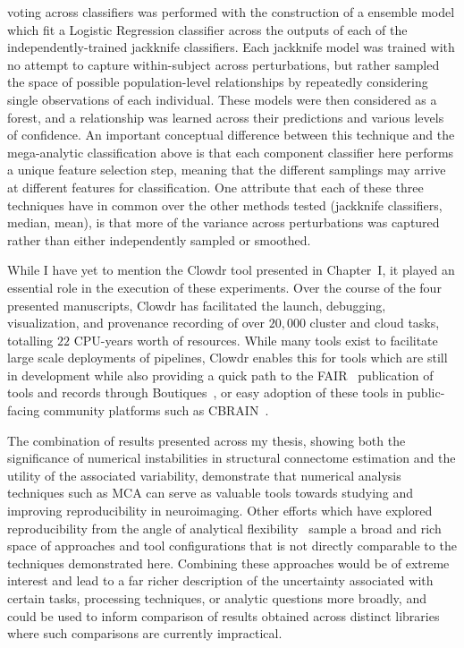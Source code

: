 voting across classifiers was performed with the construction of a ensemble model which fit a Logistic Regression
classifier across the outputs of each of the independently-trained jackknife classifiers. Each jackknife model was
trained with no attempt to capture within-subject across perturbations, but rather sampled the space of possible
population-level relationships by repeatedly considering single observations of each individual. These models were
then considered as a forest, and a relationship was learned across their predictions and various levels of
confidence. An important conceptual difference between this technique and the mega-analytic classification above is
that each component classifier here performs a unique feature selection step, meaning that the different samplings
may arrive at different features for classification. One attribute that each of these three techniques have in
common over the other methods tested (jackknife classifiers, median, mean), is that more of the variance across
perturbations was captured rather than either independently sampled or smoothed.

While I have yet to mention the Clowdr tool presented in Chapter~I, it played an essential role in the execution of
these experiments. Over the course of the four presented manuscripts, Clowdr has facilitated the launch, debugging,
visualization, and provenance recording of over $20,000$ cluster and cloud tasks, totalling $22$ CPU-years worth of
resources. While many tools exist to facilitate large scale deployments of pipelines, Clowdr enables this for tools
which are still in development while also providing a quick path to the FAIR~\cite{wilkinson2016fair} publication of
tools and records through Boutiques~\cite{Glatard2018-tu}, or easy adoption of these tools in public-facing
community platforms such as CBRAIN~\cite{sherif2014cbrain}.

The combination of results presented across my thesis, showing both the significance of numerical instabilities in
structural connectome estimation and the utility of the associated variability, demonstrate that numerical analysis
techniques such as MCA can serve as valuable tools towards studying and improving reproducibility in neuroimaging.
Other efforts which have explored reproducibility from the angle of analytical
flexibility~\cite{botvinik2020variability,schilling2020tractograph} sample a broad and rich space of approaches and
tool configurations that is not directly comparable to the techniques demonstrated here. Combining these approaches
would be of extreme interest and lead to a far richer description of the uncertainty associated with certain tasks,
processing techniques, or analytic questions more broadly, and could be used to inform comparison of results
obtained across distinct libraries where such comparisons are currently impractical.


